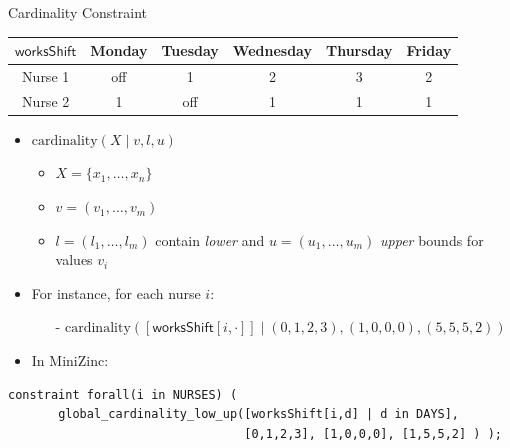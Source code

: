 \begin{frame}[fragile]{Cardinality Constraint}

\begin{center}
\begin{tabular}{|c|c|c|c|c|c|}
\hline 
$\mathsf{worksShift}$ & Monday & Tuesday & Wednesday & Thursday & Friday \\ 
\hline 
Nurse 1 & off & 1 & 2 & 3 & 2 \\ 
Nurse 2 & 1 & off & 1 & 1 & 1 \\ 
\hline 
\end{tabular} 
\end{center}%
\begin{itemize}
\item $\mathrm{cardinality}(X \mid v, l, u)$
\begin{itemize}
\item $X = \{x_1, \ldots, x_n\}$
\item $v = (v_1, \ldots, v_m)$
\item $l = (l_1, \ldots, l_m)$ contain \emph{lower} and 
$u = (u_1, \ldots, u_m)$ \emph{upper} bounds for values $v_i$ 
\end{itemize}

\vspace*{1ex} \pause

\item For instance, for each nurse $i$:
\begin{itemize}
\item[-] $\mathrm{cardinality}([ \mathsf{worksShift}[i, \cdot] ] \mid (0,1,2,3), (1,0,0,0), (5, 5, 5, 2))$
\end{itemize} 
\item In MiniZinc:
\end{itemize}
\begin{lstlisting}
constraint forall(i in NURSES) (
       global_cardinality_low_up([worksShift[i,d] | d in DAYS], 
                                 [0,1,2,3], [1,0,0,0], [1,5,5,2] ) );
\end{lstlisting}
\end{frame}
